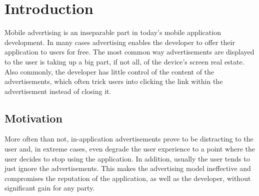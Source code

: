\chapter{Introduction}

\ifpdf
    \graphicspath{{1_introduction/figures/PNG/}{1_introduction/figures/PDF/}{1_introduction/figures/}}
\else
    \graphicspath{{1_introduction/figures/EPS/}{1_introduction/figures/}}
\fi





Mobile advertising is an inseparable part in today's mobile application development. In many cases advertising enables the developer to offer their application to users for free. The most common way advertisements are displayed to the user is taking up a big part, if not all, of the device's screen real estate. Also commonly, the developer has little control of the content of the advertisements, which often trick users into clicking the link within the advertisement instead of closing it.

\section{Motivation}
More often than not, in-application advertisements prove to be distracting to the user and, in extreme cases, even degrade the user experience to a point where the user decides to stop using the application.  In addition, usually the user tends to just ignore the advertisements. This makes the advertising model ineffective and compromises the reputation of the application, as well as the developer, without significant gain for any party.

